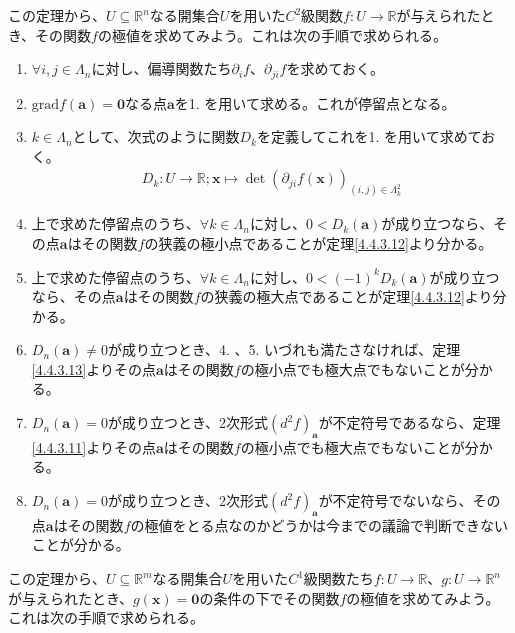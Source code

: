 \documentclass[dvipdfmx]{jsarticle}
\begin{document}
この定理から、$U \subseteq \mathbb{R}^{n}$なる開集合$U$を用いた$C^{2}$級関数$f:U \rightarrow \mathbb{R}$が与えられたとき、その関数$f$の極値を求めてみよう。これは次の手順で求められる。
\begin{enumerate}
\item
  $\forall i,j \in \varLambda_{n}$に対し、偏導関数たち$\partial_{i}f$、$\partial_{ji}f$を求めておく。
\item
  $\mathrm{grad}f\left( \mathbf{a} \right) = \mathbf{0}$なる点$\mathbf{a}$を1.
  を用いて求める。これが停留点となる。
\item
  $k \in \varLambda_{n}$として、次式のように関数$D_{k}$を定義してこれを1.
  を用いて求めておく。
\begin{align*}
D_{k}:U \rightarrow \mathbb{R};\mathbf{x} \mapsto \det\left( \partial_{ji}f\left( \mathbf{x} \right) \right)_{(i,j) \in \varLambda_{k}^{2}}
\end{align*}
\item
  上で求めた停留点のうち、$\forall k \in \varLambda_{n}$に対し、$0 < D_{k}\left( \mathbf{a} \right)$が成り立つなら、その点$\mathbf{a}$はその関数$f$の狭義の極小点であることが定理\ref{4.4.3.12}より分かる。
\item
  上で求めた停留点のうち、$\forall k \in \varLambda_{n}$に対し、$0 < ( - 1)^{k}D_{k}\left( \mathbf{a} \right)$が成り立つなら、その点$\mathbf{a}$はその関数$f$の狭義の極大点であることが定理\ref{4.4.3.12}より分かる。
\item
  $D_{n}\left( \mathbf{a} \right) \neq 0$が成り立つとき、4. 、5. いづれも満たさなければ、定理\ref{4.4.3.13}よりその点$\mathbf{a}$はその関数$f$の極小点でも極大点でもないことが分かる。
\item
  $D_{n}\left( \mathbf{a} \right) = 0$が成り立つとき、2次形式$\left( d^{2}f \right)_{\mathbf{a}}$が不定符号であるなら、定理\ref{4.4.3.11}よりその点$\mathbf{a}$はその関数$f$の極小点でも極大点でもないことが分かる。
\item
  $D_{n}\left( \mathbf{a} \right) = 0$が成り立つとき、2次形式$\left( d^{2}f \right)_{\mathbf{a}}$が不定符号でないなら、その点$\mathbf{a}$はその関数$f$の極値をとる点なのかどうかは今までの議論で判断できないことが分かる。
\end{enumerate}\par
この定理から、$U \subseteq \mathbb{R}^{m}$なる開集合$U$を用いた$C^{1}$級関数たち$f:U \rightarrow \mathbb{R}$、$g:U \rightarrow \mathbb{R}^{n}$が与えられたとき、$g\left( \mathbf{x} \right) = \mathbf{0}$の条件の下でその関数$f$の極値を求めてみよう。これは次の手順で求められる。
\end{document}
